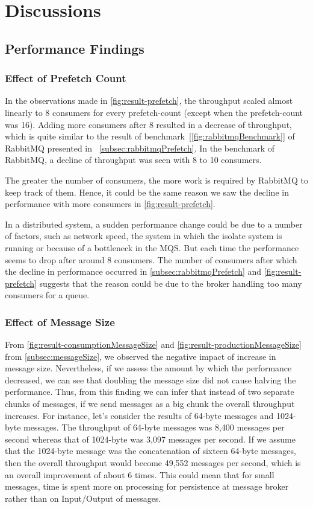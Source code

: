 \chapter{Discussions}\label{chapter:discussions}

\section{Performance Findings}
\subsection{Effect of Prefetch Count}
\label{subsec:discussion-prefetch}
  In the observations made in \autoref{fig:result-prefetch}, the throughput scaled almost linearly to 8 consumers for every prefetch-count (except when the prefetch-count was 16). Adding more consumers after 8 resulted in a decrease of throughput, which is quite similar to the result of benchmark~[\autoref{fig:rabbitmqBenchmark}] of RabbitMQ presented in ~\autoref{subsec:rabbitmqPrefetch}. In the benchmark of RabbitMQ, a decline of throughput was seen with 8 to 10 consumers.

  The greater the number of consumers, the more work is required by RabbitMQ to keep track of them. Hence, it could be the same reason we saw the decline in performance with more consumers in \autoref{fig:result-prefetch}.

  In a distributed system, a sudden performance change could be due to a number of factors, such as network speed, the system in which the isolate system is running or because of a bottleneck in the MQS. But each time the performance seems to drop after around 8 consumers. The number of consumers after which the decline in performance occurred in \autoref{subsec:rabbitmqPrefetch} and \autoref{fig:result-prefetch} suggests that the reason could be due to the broker handling too many consumers for a queue.

\subsection{Effect of Message Size}
  From \autoref{fig:result-consumptionMessageSize} and \autoref{fig:result-productionMessageSize} from \autoref{subsec:messageSize}, we observed the negative impact of increase in message size. Nevertheless, if we assess the amount by which the performance decreased, we can see that doubling the message size did not cause halving the performance. Thus, from this finding we can infer that instead of two separate chunks of messages, if we send messages as a big chunk the overall throughput increases. For instance, let's consider the results of 64-byte messages and 1024-byte messages. The throughput of 64-byte messages was 8,400 messages per second whereas that of 1024-byte was 3,097 messages per second. If we assume that the 1024-byte message was the concatenation of sixteen 64-byte messages, then the overall throughput would become 49,552 messages per second, which is an overall improvement of about 6 times. This could mean that for small messages, time is spent more on processing for persistence at message broker rather than on Input/Output of messages.

